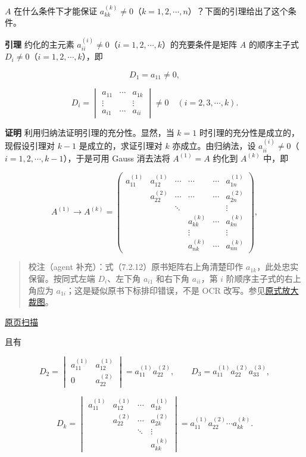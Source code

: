 \documentclass[
  10pt,
  fontset=fandol]{ctexart}
\begin{document}
\(A\) 在什么条件下才能保证 \(a_{kk}^{(k)}\ne0\)（\(k=1,2,\cdots,n\)）？下面的引理给出了这个条件。

\textbf{引理} 约化的主元素 \(a_{ii}^{(i)}\ne0\)（\(i=1,2,\cdots,k\)）的充要条件是矩阵 \(A\) 的顺序主子式 \(D_i\ne0\)（\(i=1,2,\cdots,k\)），即

\[D_1=a_{11}\ne0,\]

\[
D_i=\begin{vmatrix}
a_{11}&\cdots&a_{1k}\\
\vdots&&\vdots\\
a_{i1}&\cdots&a_{ii}
\end{vmatrix}\ne0\quad(i=2,3,\cdots,k).
\tag{7.2.12}
\]

\textbf{证明} 利用归纳法证明引理的充分性。显然，当 \(k=1\) 时引理的充分性是成立的，现假设引理对 \(k-1\) 是成立的，求证引理对 \(k\) 亦成立。由归纳法，设 \(a_{ii}^{(i)}\ne0\)（\(i=1,2,\cdots,k-1\)），于是可用 Gauss 消去法将 \(A^{(1)}=A\) 约化到 \(A^{(k)}\) 中，即

\[
A^{(1)}\to A^{(k)}=\begin{pmatrix}
a_{11}^{(1)}&a_{12}^{(1)}&\cdots&\cdots&\cdots&a_{1n}^{(1)}\\
&a_{22}^{(2)}&\cdots&\cdots&\cdots&a_{2n}^{(2)}\\
&&\ddots&&&\vdots\\
&&&a_{kk}^{(k)}&\cdots&a_{kn}^{(k)}\\
&&&\vdots&&\vdots\\
&&&a_{nk}^{(k)}&\cdots&a_{nn}^{(k)}
\end{pmatrix},
\]

\begin{quote}
校注（agent 补充）：式（7.2.12）原书矩阵右上角清楚印作 \(a_{1k}\)，此处忠实保留。按同式左端 \(D_i\)、左下角 \(a_{i1}\) 和右下角 \(a_{ii}\)，第 \(i\) 阶顺序主子式的右上角应为 \(a_{1i}\)；这是疑似原书下标排印错误，不是 OCR 改写。参见\href{../assets/ch07a/pdf-180-principal-minor-detail.png}{原式放大裁图}。
\end{quote}

\href{../../source-images/pdf-181.jpeg}{原页扫描}

且有

\[
D_2=\begin{vmatrix}a_{11}^{(1)}&a_{12}^{(1)}\\0&a_{22}^{(2)}\end{vmatrix}
=a_{11}^{(1)}a_{22}^{(2)},\qquad
D_3=a_{11}^{(1)}a_{22}^{(2)}a_{33}^{(3)},
\]

\[
D_k=\begin{vmatrix}
a_{11}^{(1)}&a_{12}^{(1)}&\cdots&a_{1k}^{(1)}\\
&a_{22}^{(2)}&\cdots&a_{2k}^{(2)}\\
&&\ddots&\vdots\\
&&&a_{kk}^{(k)}
\end{vmatrix}
=a_{11}^{(1)}a_{22}^{(2)}\cdots a_{kk}^{(k)}.
\tag{7.2.13}
\]
\end{document}
